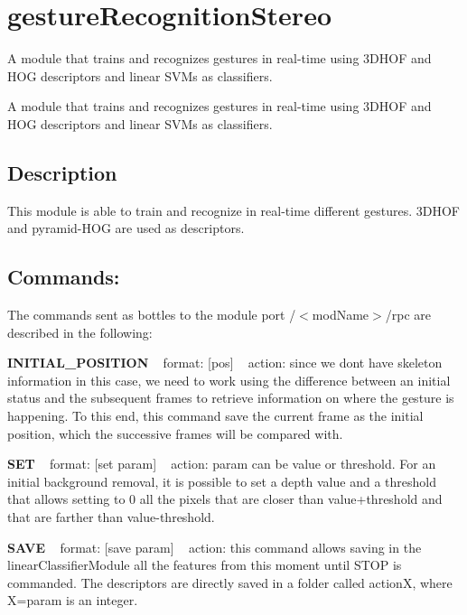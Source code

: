 \section{gesture\+Recognition\+Stereo}
\label{group__gestureRecognitionStereo}


A module that trains and recognizes gestures in real-\/time using 3\+D\+H\+OF and H\+OG descriptors and linear S\+V\+Ms as classifiers.  


A module that trains and recognizes gestures in real-\/time using 3\+D\+H\+OF and H\+OG descriptors and linear S\+V\+Ms as classifiers. 

\hypertarget{group__gestureRecognitionStereo_intro_sec}{}\subsection{Description}\label{group__gestureRecognitionStereo_intro_sec}
This module is able to train and recognize in real-\/time different gestures. 3\+D\+H\+OF and pyramid-\/\+H\+OG are used as descriptors.\hypertarget{group__gestureRecognitionStereo_rpc_port}{}\subsection{Commands\+:}\label{group__gestureRecognitionStereo_rpc_port}
The commands sent as bottles to the module port /$<$mod\+Name$>$/rpc are described in the following\+:

{\bfseries I\+N\+I\+T\+I\+A\+L\+\_\+\+P\+O\+S\+I\+T\+I\+ON} ~\newline
format\+: \mbox{[}pos\mbox{]} ~\newline
action\+: since we don\textquotesingle{}t have skeleton information in this case, we need to work using the difference between an initial status and the subsequent frames to retrieve information on where the gesture is happening. To this end, this command save the current frame as the initial position, which the successive frames will be compared with.

{\bfseries S\+ET} ~\newline
format\+: \mbox{[}set param\mbox{]} ~\newline
action\+: param can be value or threshold. For an initial background removal, it is possible to set a depth value and a threshold that allows setting to 0 all the pixels that are closer than value+threshold and that are farther than value-\/threshold.

{\bfseries S\+A\+VE} ~\newline
format\+: \mbox{[}save param\mbox{]} ~\newline
action\+: this command allows saving in the linear\+Classifier\+Module all the features from this moment until S\+T\+OP is commanded. The descriptors are directly saved in a folder called actionX, where X=param is an integer.

